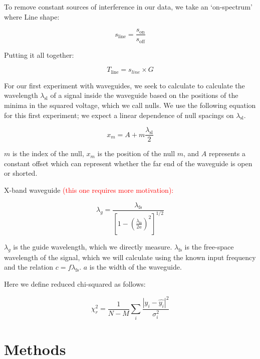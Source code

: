 \documentclass[12pt]{article}
\begin{document}
To remove constant sources of interference in our data, we take an `on-spectrum' where 
Line shape:

\begin{equation}
s_\text{line} = \frac{s_\text{on}}{s_\text{off}}
\end{equation}

Putting it all together:

\begin{equation}
T_\text{line} = s_{line} \times G
\end{equation}

For our first experiment with waveguides, we seek to calculate to calculate the wavelength $\lambda_\text{sl}$ of a signal inside the waveguide based on the positions of the minima in the squared voltage, which we call nulls. We use the following equation for this first experiment; we expect a linear dependence of null spacings on $\lambda_\text{sl}$.

\begin{equation}
x_m = A + m \frac{\lambda_\text{sl}}{2}
\end{equation}

$m$ is the index of the null, $x_m$ is the position of the null $m$, and $A$ represents a constant offset which can represent whether the far end of the waveguide is open or shorted.

X-band waveguide \textcolor{red}{(this one requires more motivation):}

\begin{equation} \label{eq:xband}
\lambda_g = \frac{\lambda_\text{fs}}{[1 - (\frac{\lambda_\text{fs}}{2a})^2]^{1/2}}
\end{equation}

$\lambda_g$ is the guide wavelength, which we directly measure. $\lambda_\text{fs}$ is the free-space wavelength of the signal, which we will calculate using the known input frequency and the relation $c = f \lambda_\text{fs}$. $a$ is the width of the waveguide.

Here we define reduced chi-squared as follows:

\begin{equation}
\chi_r^2 = \frac{1}{N - M} \sum_i \frac{|y_i - \hat{y_i}|^2}{\sigma_i^2}
\end{equation}

\section{Methods}
\end{document}

